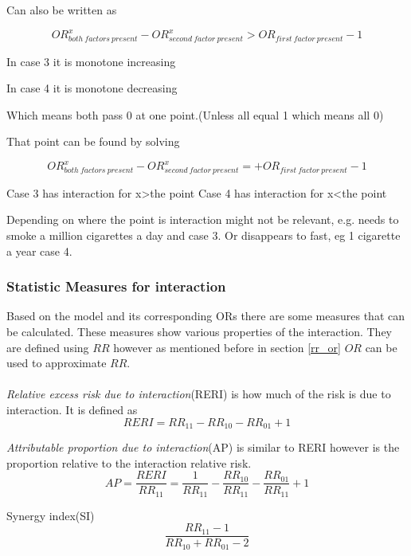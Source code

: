 \documentclass[10pt,a4paper]{report}
\begin{document}
Can also be written as

\begin{equation}
OR_{both\:factors\:present}^x-OR_{second\:factor\:present}^x>OR_{first\:factor\:present}-1
\end{equation}

In case 3 it is monotone increasing

In case 4 it is monotone decreasing

Which means both pass 0 at one point.(Unless all equal 1 which means all 0)

That point can be found by solving

\begin{equation}
OR_{both\:factors\:present}^x-OR_{second\:factor\:present}^x=+OR_{first\:factor\:present}-1
\end{equation}

Case 3 has interaction for x>the point
Case 4 has interaction for x<the point

Depending on where the point is interaction might not be relevant, e.g. needs to smoke a million cigarettes a day and case 3. Or disappears to fast, eg 1 cigarette a year case 4.

\subsubsection{Statistic Measures for interaction}
Based on the model and its corresponding ORs there are some measures that can be calculated. These measures show various properties of the interaction. They are defined using $RR$ however as mentioned before in section \ref{rr_or} $OR$ can be used to approximate $RR$.\\
\\
\emph{Relative  excess risk due to interaction}(RERI) is how much of the risk is due to interaction\cite{recoding_2011}. It is defined as\cite{recoding_2011}
\begin{equation}
RERI=RR_{11}-RR_{10}-RR_{01}+1
\end{equation}

\emph{Attributable proportion due to interaction}(AP) is similar to RERI however is the proportion relative to the interaction relative risk\cite{recoding_2011}.
\begin{equation}
AP=\frac{RERI}{RR_{11}}=\frac{1}{RR_{11}}-\frac{RR_{10}}{RR_{11}}-\frac{RR_{01}}{RR_{11}}+1
\end{equation}

Synergy index(SI)\cite{recoding_2011}
\begin{equation}
\frac{RR_{11}-1}{RR_{10}+RR_{01}-2}
\end{equation}
\end{document}
